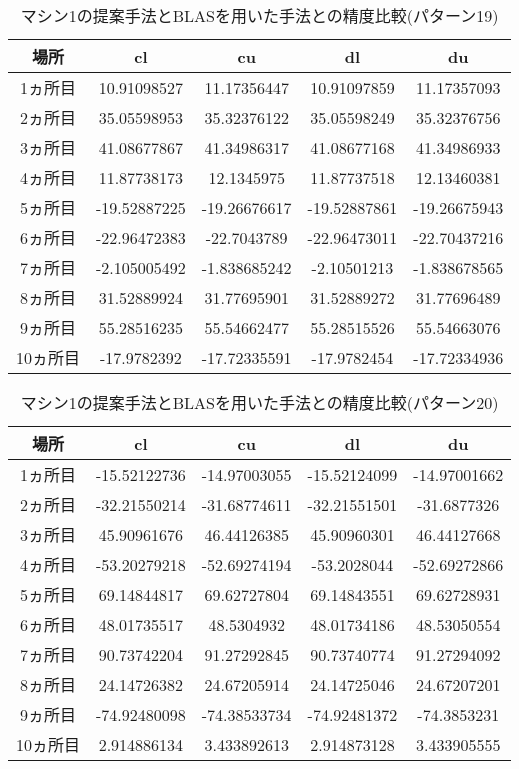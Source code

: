 \documentclass[11pt,a4paper]{jsreport}
\theoremstyle{definition}
\begin{document}
\begin{table}[H]
\centering
\begin{tabular}{|c|c|c|c|c|}
\hline
場所 & cl & cu & dl & du \\ \hline
1ヵ所目 & 10.91098527 & 11.17356447 & 10.91097859 & 11.17357093 \\ \hline
2ヵ所目 & 35.05598953 & 35.32376122 & 35.05598249 & 35.32376756 \\ \hline
3ヵ所目 & 41.08677867 & 41.34986317 & 41.08677168 & 41.34986933 \\ \hline
4ヵ所目 & 11.87738173 & 12.1345975 & 11.87737518 & 12.13460381 \\ \hline
5ヵ所目 & -19.52887225 & -19.26676617 & -19.52887861 & -19.26675943 \\ \hline
6ヵ所目 & -22.96472383 & -22.7043789 & -22.96473011 & -22.70437216 \\ \hline
7ヵ所目 & -2.105005492 & -1.838685242 & -2.10501213 & -1.838678565 \\ \hline
8ヵ所目 & 31.52889924 & 31.77695901 & 31.52889272 & 31.77696489 \\ \hline
9ヵ所目 & 55.28516235 & 55.54662477 & 55.28515526 & 55.54663076 \\ \hline
10ヵ所目 & -17.9782392 & -17.72335591 & -17.9782454 & -17.72334936 \\ \hline
\end{tabular}
\caption{マシン1の提案手法とBLASを用いた手法との精度比較(パターン19)}
\end{table}

\begin{table}[H]
\centering
\begin{tabular}{|c|c|c|c|c|}
\hline
場所 & cl & cu & dl & du \\ \hline
1ヵ所目 & -15.52122736 & -14.97003055 & -15.52124099 & -14.97001662 \\ \hline
2ヵ所目 & -32.21550214 & -31.68774611 & -32.21551501 & -31.6877326 \\ \hline
3ヵ所目 & 45.90961676 & 46.44126385 & 45.90960301 & 46.44127668 \\ \hline
4ヵ所目 & -53.20279218 & -52.69274194 & -53.2028044 & -52.69272866 \\ \hline
5ヵ所目 & 69.14844817 & 69.62727804 & 69.14843551 & 69.62728931 \\ \hline
6ヵ所目 & 48.01735517 & 48.5304932 & 48.01734186 & 48.53050554 \\ \hline
7ヵ所目 & 90.73742204 & 91.27292845 & 90.73740774 & 91.27294092 \\ \hline
8ヵ所目 & 24.14726382 & 24.67205914 & 24.14725046 & 24.67207201 \\ \hline
9ヵ所目 & -74.92480098 & -74.38533734 & -74.92481372 & -74.3853231 \\ \hline
10ヵ所目 & 2.914886134 & 3.433892613 & 2.914873128 & 3.433905555 \\ \hline
\end{tabular}
\caption{マシン1の提案手法とBLASを用いた手法との精度比較(パターン20)}
\end{table}
\end{document}
